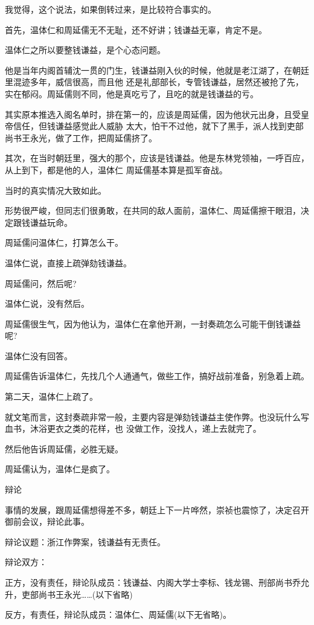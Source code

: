 \documentclass[11pt,a4paper,onecolumn]{article}
\begin{document}
我觉得，这个说法，如果倒转过来，是比较符合事实的。

首先，温体仁和周延儒无不无耻，还不好讲；钱谦益无辜，肯定不是。

温体仁之所以要整钱谦益，是个心态问题。

他是当年内阁首辅沈一贯的门生，钱谦益刚入伙的时候，他就是老江湖了，在朝廷里混迹多年，威信很高，而且他
还是礼部部长，专管钱谦益，居然还被抢了先，实在郁闷。周延儒则不同，他是真吃亏了，且吃的就是钱谦益的亏。

其实原本推选入阁名单时，排在第一的，应该是周延儒，因为他状元出身，且受皇帝信任，但钱谦益感觉此人威胁
太大，怕干不过他，就下了黑手，派人找到吏部尚书王永光，做了工作，把周延儒挤了。

其次，在当时朝廷里，强大的那个，应该是钱谦益。他是东林党领袖，一呼百应，从上到下，都是他的人，温体仁
周延儒基本算是孤军奋战。

当时的真实情况大致如此。

形势很严峻，但同志们很勇敢，在共同的敌人面前，温体仁、周延儒擦干眼泪，决定跟钱谦益玩命。

周延儒问温体仁，打算怎么干。

温体仁说，直接上疏弹劾钱谦益。

周延儒问，然后呢?

温体仁说，没有然后。

周延儒很生气，因为他认为，温体仁在拿他开涮，一封奏疏怎么可能干倒钱谦益呢?

温体仁没有回答。

周延儒告诉温体仁，先找几个人通通气，做些工作，搞好战前准备，别急着上疏。

第二天，温体仁上疏了。

就文笔而言，这封奏疏非常一般，主要内容是弹劾钱谦益主使作弊。也没玩什么写血书，沐浴更衣之类的花样，也
没做工作，没找人，递上去就完了。

然后他告诉周延儒，必胜无疑。

周延儒认为，温体仁是疯了。

辩论

事情的发展，跟周延儒想得差不多，朝廷上下一片哗然，崇祯也震惊了，决定召开御前会议，辩论此事。

辩论议题：浙江作弊案，钱谦益有无责任。

辩论双方：

正方，没有责任，辩论队成员：钱谦益、内阁大学士李标、钱龙锡、刑部尚书乔允升，吏部尚书王永光……(以下省略)

反方，有责任，辩论队成员：温体仁、周延儒(以下无省略)。

\section[\thesection]{}
\end{document}
